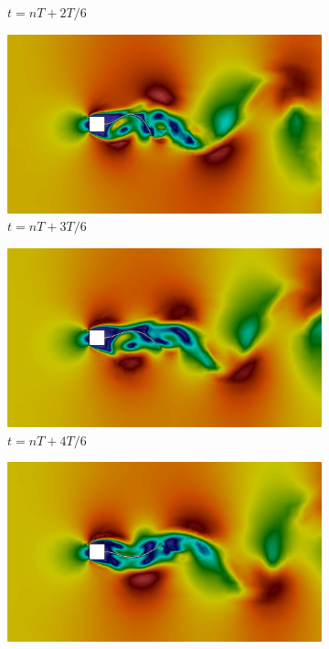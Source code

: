 \begin{figure}[h!]
\begin{subfigure}[b]{0.49\textwidth}
        \caption{$t=nT+2T/6$}
    \end{subfigure}
    \begin{subfigure}[b]{0.49\textwidth}
        \includegraphics[width=\linewidth]{Figuras/FSI-prism/vT4.png}
        \caption{$t=nT+3T/6$}
    \end{subfigure}
    \begin{subfigure}[b]{0.49\textwidth}
        \includegraphics[width=\linewidth]{Figuras/FSI-prism/vT5.png}
        \caption{$t=nT+4T/6$}
    \end{subfigure}
    \begin{subfigure}[b]{0.49\textwidth}
        \includegraphics[width=\linewidth]{Figuras/FSI-prism/vT6.png}

\end{subfigure}
\end{figure}
